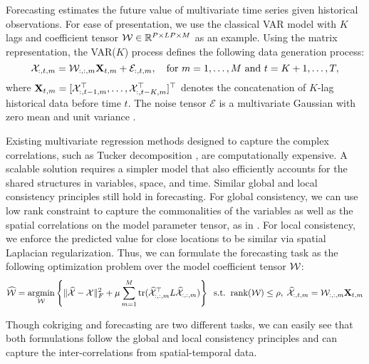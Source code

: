 Forecasting estimates the future value of multivariate time series given historical observations. For ease of presentation, we use the classical VAR model with  $K$ lags and coefficient tensor ${\mathcal W} \in \mathbb{R}^{P\times LP\times M}$ as an example. Using the matrix representation, the VAR($K$) process defines the following data generation process:
\begin{equation}
{\mathcal X}_{:,t,m} = \mathcal{W}_{:,:, m}\mathbf{X}_{t, m} + \mathcal{E}_{:,t,m}, \quad \text{for } m = 1, \ldots, M \text{ and } t = K+1, \ldots, T,
\label{eqn:auto-regressive} 
\end{equation}
\noindent where $\mathbf{X}_{t, m} = [{\mathcal X}_{:, t-1, m}^{\top}, \ldots, {\mathcal X}_{:, t-K, m}^{\top}]^{\top}$ denotes the concatenation of $K$-lag historical data before time $t$. The noise tensor $\mathcal{E}$ is a multivariate Gaussian with zero mean and unit variance .

Existing multivariate regression methods designed to capture the complex correlations, such as Tucker decomposition \cite{romera2013multilinear}, are computationally expensive. 
A scalable solution requires a simpler model that also efficiently accounts for the shared structures in variables, space, and time. Similar global and local consistency principles still hold in forecasting. For global consistency, we can use low rank constraint to capture the commonalities of the variables as well as the spatial correlations on the model parameter tensor, as in \cite{cressie2010fixed}. For local consistency, we enforce the predicted value for close locations to be similar via spatial Laplacian regularization. Thus, we can formulate the forecasting task as the following optimization problem over the model coefficient tensor ${\mathcal W}$:
\begin{equation}
\widehat{{\mathcal W}} = \operatorname*{argmin}_{{\mathcal W}} \left\{ \| \widehat{{\mathcal X}}- {\mathcal X} \|^2_F +  \mu \sum\limits_{m=1}^M \text{tr} (\widehat{{\mathcal X}}_{:,:,m}^\top L \widehat{{\mathcal X}}_{:,:,m}) \right\} 
\;\;\text{s.t.} \;\; \text{rank}({\mathcal W}) \leq \rho, \; \widehat{{\mathcal X}}_{:,t,m} = \mathcal{W}_{:,:, m}\mathbf{X}_{t, m}
\label{eqn:forecasting}
\end{equation}

Though cokriging and forecasting are two different tasks, we can easily see that both formulations follow the global and local consistency principles and can capture the inter-correlations from spatial-temporal data.

 